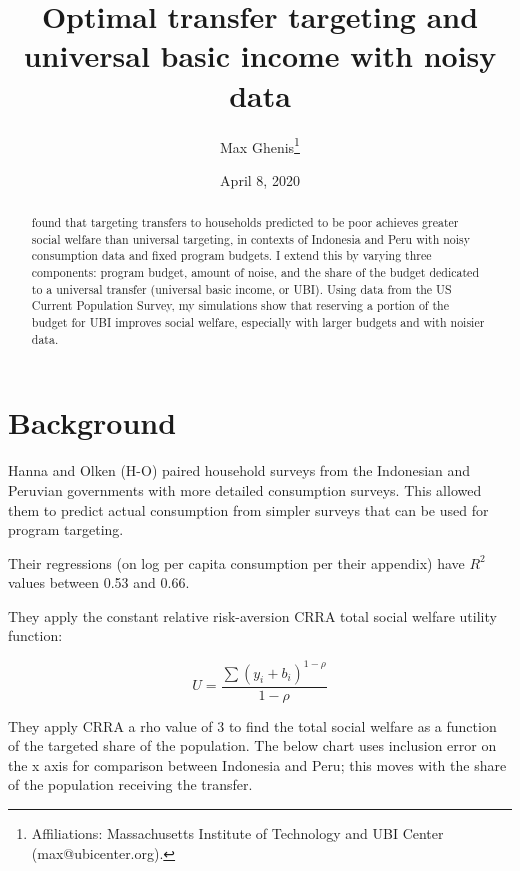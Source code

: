 \documentclass[12pt]{article}
\begin{document}
\begin{titlepage}
\title{Optimal transfer targeting and universal basic income with noisy data}
\author{Max Ghenis\thanks{Affiliations: Massachusetts Institute of Technology and UBI Center (max@ubicenter.org).
}}

\date{April 8, 2020}
\maketitle
\begin{abstract}
\noindent {} found that targeting transfers to households 
predicted to be poor achieves greater social welfare than universal targeting, 
in contexts of Indonesia and Peru with noisy consumption data and fixed program 
budgets. I extend this by varying three components: program budget, amount of 
noise, and the share of the budget dedicated to a universal transfer (universal 
basic income, or UBI). Using data from the US Current Population Survey, my 
simulations show that reserving a portion of the budget for UBI improves social 
welfare, especially with larger budgets and with noisier data.

\bigskip
\end{abstract}
\setcounter{page}{0}
\thispagestyle{empty}
\end{titlepage}
\pagebreak \newpage




\doublespacing


\section{Background} \label{sec:background}

Hanna and Olken (H-O) paired household surveys from the Indonesian and 
Peruvian governments with more detailed consumption surveys. This allowed them 
to predict actual consumption from simpler surveys that can be used for program 
targeting.

Their regressions (on log per capita consumption per their appendix) have $R^2$ 
values between 0.53 and 0.66.

They apply the constant relative risk-aversion CRRA total social welfare 
utility function:

\begin{equation}
U = \frac{\sum{(y_i + b_i)^{1-\rho}}}{1-\rho}
\end{equation}

They apply CRRA a rho value of 3 to find the total social welfare as a function 
of the targeted share of the population. The below chart uses inclusion error 
on the x axis for comparison between Indonesia and Peru; this moves with the 
share of the population receiving the transfer.
\end{document}
